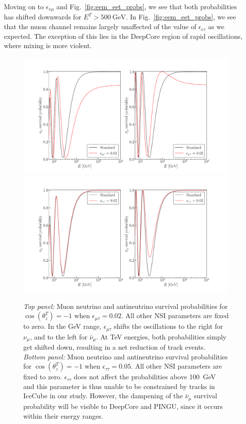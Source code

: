\documentclass{article}
\newcommand{\ztrue}{\ensuremath{\cos{(\theta_z^{T})}}}
\newcommand{\emt}{\ensuremath{\epsilon_{\mu\tau}}}
\newcommand{\eet}{\epsilon_{e\tau}}
\newcommand{\eem}{\epsilon_{e\mu}}
\newcommand{\ett}{\ensuremath{\epsilon_{\tau\tau}}}
\newcommand{\Etrue}{E^{T}}
\newcommand{\nm}{\nu_\mu}
\newcommand{\anm}{\bar\nu_\mu}
\begin{document}
Moving on to $\eem$ and Fig.~\ref{fig:eem_eet_probs}, we see that both probabilities has shifted downwards for $\Etrue > \SI{500}{\GeV}$.
In Fig.~\ref{fig:eem_eet_probs}, we see that the muon channel remains largely unaffected of the value of $\eet$ as we expected. The exception of this lies 
in the DeepCore region of rapid oscillations, where mixing is more violent. 
\begin{figure}
    \begin{center}
        \includegraphics[width=0.99\textwidth]{figures/Pmm_emt_probs.pdf}
        \includegraphics[width=0.99\textwidth]{figures/Pmm_ett_probs.pdf}
        \caption{\emph{Top panel:} Muon neutrino and antineutrino survival probabilities for
        $\ztrue = -1$ when $\emt = 0.02$. All other NSI parameters are fixed to zero. In the \si{\GeV} range, $\emt$ shifts the oscillations to the right for $\nm$, and to the left for $\anm$. At \si{\TeV} energies, both probabilities simply get shifted down, resulting in a net reduction of track events.
        \emph{Bottom panel:} Muon neutrino and antineutrino survival probabilities for
        $\ztrue = -1$ when $\ett = 0.05$. All other NSI parameters are fixed to zero. $\ett$ does not affect the probabilities above \SI{100}{\GeV} and this parameter is thus unable to be constrained by tracks in IceCube in our study. However, the dampening of the $\anm$ survival probability will be visible to DeepCore and PINGU, since it occurs within their energy ranges.}
        \label{fig:emt_ett_probs}
    \end{center}
\end{figure}
\end{document}

